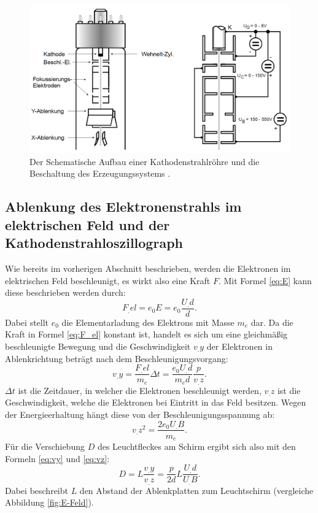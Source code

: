 \begin{figure}
\centering
\includegraphics[width=\linewidth-50pt,height=\textheight-50pt,keepaspectratio]{content/images/Kathodenstrahlroehre.jpg}
\caption{Der Schematische Aufbau einer Kathodenstrahlröhre und die Beschaltung des Erzeugungssystems \cite{V501}.}
\label{fig:Kathodenstrahlröhre}
\end{figure}

\subsection{Ablenkung des Elektronenstrahls im elektrischen Feld und der Kathodenstrahloszillograph}

Wie bereits im vorherigen Abschnitt beschrieben, werden die Elektronen im elektrischen Feld beschleunigt, es wirkt also eine Kraft $F$. Mit Formel \eqref{eq:E} kann diese beschrieben werden durch:
\begin{equation}
F_.{el} = e_0E = e_0\frac{U_.d}{d}\text{.}\label{eq:F_el}
\end{equation}  
Dabei stellt $e_0$ die Elementarladung des Elektrons mit Masse $m_e$ dar. Da die Kraft in Formel \eqref{eq:F_el} konstant ist, handelt es sich um eine gleichmäßig beschleunigte Bewegung und die Geschwindigkeit $v_.y$ der Elektronen in Ablenkrichtung beträgt nach dem Beschleunigungsvorgang:
\begin{equation}
v_.y = \frac{F_.{el}}{m_e}\Delta t = \frac{e_0U_.d}{m_ed}\frac{p}{v_.z}\text{.}\label{eq:vy}
\end{equation}
$\Delta t$ ist die Zeitdauer, in welcher die Elektronen beschleunigt werden, $v_.z$ ist die Geschwindigkeit, welche die Elektronen bei Eintritt in das Feld besitzen. Wegen der Energieerhaltung hängt diese von der Beschleunigungsspannung ab:
\begin{equation}
v_.z^2 = \frac{2e_0U_.B}{m_e}\text{.}\label{eq:vz}
\end{equation}
Für die Verschiebung $D$ des Leuchtfleckes am Schirm ergibt sich also mit den Formeln \eqref{eq:vy} und \eqref{eq:vz}:
\begin{equation}
D = L\frac{v_.y}{v_.z} = \frac{p}{2d}L\frac{U_.d}{U_.B}\text{.}\label{eq:D}
\end{equation}   
Dabei beschreibt $L$ den Abstand der Ablenkplatten zum Leuchtschirm (vergleiche Abbildung \ref{fig:E-Feld}).

